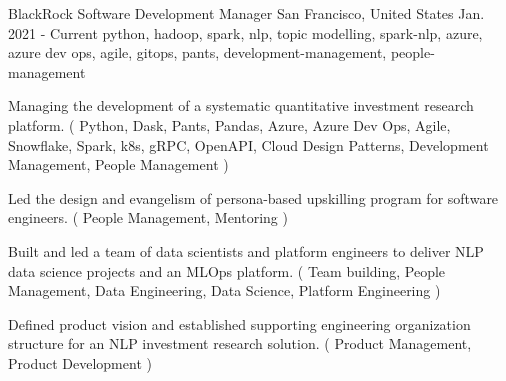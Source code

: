 \cventry
    {BlackRock} %
    {Software Development Manager} %
    {San Francisco, United States} %
    {Jan. 2021 - Current} %
    { python, hadoop, spark, nlp, topic modelling, spark-nlp, azure, azure dev ops, agile, gitops, pants, development-management, people-management} %
    {
    \begin{cvitems} %
       \item { Managing the development of a systematic quantitative investment research platform. ( Python, Dask, Pants, Pandas, Azure, Azure Dev Ops, Agile, Snowflake, Spark, k8s, gRPC, OpenAPI, Cloud Design Patterns, Development Management, People Management ) }
       \item { Led the design and evangelism of persona-based upskilling program for software engineers. ( People Management, Mentoring ) }
       \item { Built and led a team of data scientists and platform engineers to deliver NLP data science projects and an MLOps platform. ( Team building, People Management, Data Engineering, Data Science, Platform Engineering ) }
       \item { Defined product vision and established supporting engineering organization structure for an NLP investment research solution. ( Product Management, Product Development ) }
    \end{cvitems}
    }
